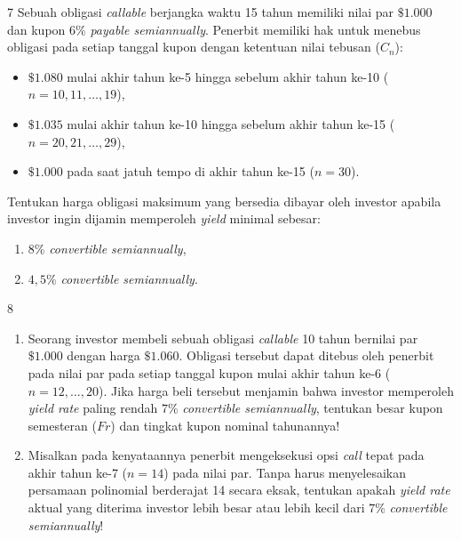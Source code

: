 \documentclass[11pt,a4paper]{article}
\begin{document}
\begin{naskahsoalbox}{7}
Sebuah obligasi \textit{callable} berjangka waktu 15 tahun memiliki nilai par $\$1.000$ dan kupon $6\%$ \textit{payable semiannually}. Penerbit memiliki hak untuk menebus obligasi pada setiap tanggal kupon dengan ketentuan nilai tebusan ($C_n$):
\begin{itemize}[leftmargin=6mm, topsep=1pt, itemsep=1pt]
    \item $\$1.080$ mulai akhir tahun ke-5 hingga sebelum akhir tahun ke-10 ($n = 10, 11, \dots, 19$),
    \item $\$1.035$ mulai akhir tahun ke-10 hingga sebelum akhir tahun ke-15 ($n = 20, 21, \dots, 29$),
    \item $\$1.000$ pada saat jatuh tempo di akhir tahun ke-15 ($n = 30$).
\end{itemize}
Tentukan harga obligasi maksimum yang bersedia dibayar oleh investor apabila investor ingin dijamin memperoleh \textit{yield} minimal sebesar:
\begin{enumerate}[label=(\alph*), leftmargin=6mm, topsep=1pt, itemsep=1pt]
    \item $8\%$ \textit{convertible semiannually},
    \item $4{,}5\%$ \textit{convertible semiannually}.
\end{enumerate}
\end{naskahsoalbox}

\begin{naskahsoalbox}{8}
\begin{enumerate}[label=(\alph*), leftmargin=6mm, topsep=1pt, itemsep=2pt]
    \item Seorang investor membeli sebuah obligasi \textit{callable} 10 tahun bernilai par $\$1.000$ dengan harga $\$1.060$. Obligasi tersebut dapat ditebus oleh penerbit pada nilai par pada setiap tanggal kupon mulai akhir tahun ke-6 ($n = 12, \dots, 20$). Jika harga beli tersebut menjamin bahwa investor memperoleh \textit{yield rate} paling rendah $7\%$ \textit{convertible semiannually}, tentukan besar kupon semesteran ($Fr$) dan tingkat kupon nominal tahunannya!
    \item Misalkan pada kenyataannya penerbit mengeksekusi opsi \textit{call} tepat pada akhir tahun ke-7 ($n = 14$) pada nilai par. Tanpa harus menyelesaikan persamaan polinomial berderajat 14 secara eksak, tentukan apakah \textit{yield rate} aktual yang diterima investor lebih besar atau lebih kecil dari $7\%$ \textit{convertible semiannually}!
\end{enumerate}
\end{naskahsoalbox}
\end{document}
